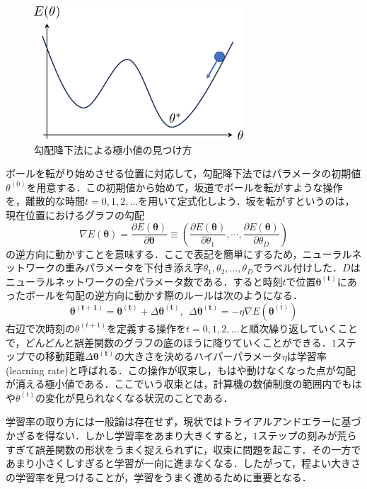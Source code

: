 \documentclass[a4paper,11pt]{jsreport}
\begin{document}
\begin{figure}
  \begin{center}
    \includegraphics[height=5cm]{image/gradient_decent.png}
    \caption{勾配降下法による極小値の見つけ方}
    \label{勾配降下法イメージ図}
  \end{center}
\end{figure}

ボールを転がり始めさせる位置に対応して，勾配降下法ではパラメータの初期値$\theta^{(0)}$を用意する．この初期値から始めて，坂道でボールを転がすような操作を，離散的な時間$t=0,1,2,\dots$を用いて定式化しよう．坂を転がすというのは，現在位置におけるグラフの勾配
\begin{equation}
  \nabla E(\bm{\theta})
  = \frac{\partial E(\bm{\theta})}{\partial \bm{\theta}}
  \equiv \left(  \frac{\partial E(\bm{\theta})}{\partial \theta_1}, \cdots,  \frac{\partial E(\bm{\theta})}{\partial \theta_D} \right)
\end{equation}
の逆方向に動かすことを意味する．ここで表記を簡単にするため，ニューラルネットワークの重みパラメータを下付き添え字$\theta_1,\theta_2,\dots,\theta_D$でラベル付けした．$D$はニューラルネットワークの全パラメータ数である．すると時刻$t$で位置$\bm{\theta^{(t)}}$にあったボールを勾配の逆方向に動かす際のルールは次のようになる．
\begin{equation}
  \bm{\theta^{(t+1)}} = \bm{\theta^{(t)}} + \Delta \bm{\theta^{(t)}} , \ \  \Delta \bm{\theta^{(t)}} = - \eta \nabla E\left( \bm{\theta}^{(t)} \right)
\end{equation}
右辺で次時刻の$\theta^{(t+1)}$を定義する操作を$t=0,1,2,\dots$と順次繰り返していくことで，どんどんと誤差関数のグラフの底のほうに降りていくことができる．$1$ステップでの移動距離$\Delta \bm{\theta^{(t)}}$の大きさを決めるハイパーパラメータ$\eta$は学習率(learning rate)と呼ばれる．この操作が収束し，もはや動けなくなった点が勾配が消える極小値である．ここでいう収束とは，計算機の数値制度の範囲内でもはや$\theta^{(t)}$の変化が見られなくなる状況のことである．\par
学習率の取り方には一般論は存在せず，現状ではトライアルアンドエラーに基づかざるを得ない．しかし学習率をあまり大きくすると，$1$ステップの刻みが荒らすぎて誤差関数の形状をうまく捉えられずに，収束に問題を起こす．その一方であまり小さくしすぎると学習が一向に進まなくなる．したがって，程よい大きさの学習率を見つけることが，学習をうまく進めるために重要となる．\par
\end{document}
